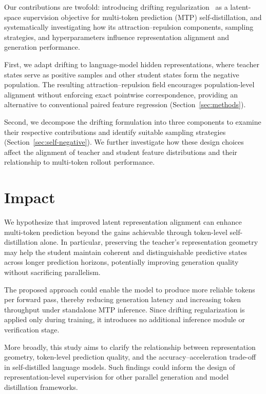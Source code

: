 \documentclass{article}
\begin{document}
Our contributions are twofold: introducing drifting
regularization~\citep{deng2026drifting} as a latent-space
supervision objective for multi-token prediction (MTP)
self-distillation, and systematically investigating how
its attraction--repulsion components, sampling strategies,
and hyperparameters influence representation alignment
and generation performance.

First, we adapt drifting to language-model hidden
representations, where teacher states serve as positive
samples and other student states form the negative
population. The resulting attraction--repulsion field
encourages population-level alignment without enforcing
exact pointwise correspondence, providing an alternative
to conventional paired feature regression
(Section~\ref{sec:methods}).

Second, we decompose the drifting formulation into three
components to examine their respective contributions
and identify suitable sampling strategies
(Section~\ref{sec:self-negative}). We further investigate
how these design choices affect the alignment of
teacher and student feature distributions and their
relationship to multi-token rollout performance.

\section{Impact}
\label{sec:impact}

We hypothesize that improved latent representation alignment
can enhance multi-token prediction beyond the gains achievable
through token-level self-distillation alone. In particular,
preserving the teacher's representation geometry may help
the student maintain coherent and distinguishable predictive
states across longer prediction horizons, potentially improving
generation quality without sacrificing parallelism.

The proposed approach could enable the model to produce
more reliable tokens per forward pass, thereby reducing
generation latency and increasing token throughput under
standalone MTP inference. Since drifting regularization is
applied only during training, it introduces no additional
inference module or verification stage.

More broadly, this study aims to clarify the relationship
between representation geometry, token-level prediction
quality, and the accuracy--acceleration trade-off in
self-distilled language models. Such findings could inform
the design of representation-level supervision for other
parallel generation and model distillation frameworks.
\end{document}
